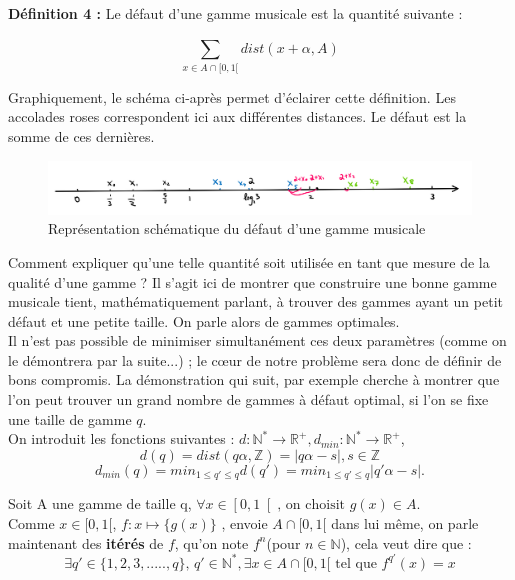 \documentclass[moyen]{classeUPD}
\newenvironment{definition}{
	\begin{lrbox}{\tempbox}
		\begin{minipage}{\textwidth}
		}{
		\end{minipage}
	\end{lrbox}
	\begin{center}
		\fcolorbox[HTML]{222222}{EEEEEE}{
			\usebox{\tempbox}
		}
	\end{center}
}
\newcommand{\emf}[1]{\textbf{#1}}
\begin{document}
\begin{definition}
\emf{Définition 4 :} Le défaut d'une gamme musicale est la quantité suivante :

\begin{equation*}
\sum_{x\in A \cap [0,1[}^{} dist(x+\alpha,A)
\end{equation*}

\end{definition}

Graphiquement, le schéma ci-après permet d'éclairer cette définition. Les accolades roses correspondent ici aux différentes distances. Le défaut est la somme de ces dernières.
 
\begin{figure}[h!]
	\begin{center}
		\includegraphics[width=0.7\textheight]{picture1}
		\caption{Représentation schématique du défaut d'une gamme musicale}
		\label{figure 4}
	\end{center}
\end{figure}

Comment expliquer qu’une telle quantité soit utilisée en tant que mesure de la qualité d’une gamme ? Il s’agit ici de montrer que construire une bonne gamme musicale tient, mathématiquement parlant, à trouver des gammes ayant un petit défaut et une petite taille. On parle alors de gammes optimales.\\
Il n’est pas possible de minimiser simultanément ces deux paramètres (comme on le démontrera par la suite...) ; le cœur de notre problème sera donc de définir de bons compromis. La démonstration qui suit, par exemple cherche à montrer que l’on peut trouver un grand nombre de gammes à défaut optimal, si l’on se fixe une taille de gamme $q$.\\

On introduit les fonctions suivantes : $d: \mathbb{N^{*}} \longrightarrow \mathbb{R^{+}} ,d_{min} :\mathbb{N^{*}} \longrightarrow \mathbb{R^{+}} $,
$$d(q)=dist(q\alpha, \mathbb{Z})= \left|q\alpha  - s\right| ,s \in \mathbb{Z}$$
$$d_{min}(q) = min _{1 \le q' \le q} d(q') = min_{1 \le q' \le q} \left|q'\alpha - s\right| .$$

Soit A une gamme de taille q, 
$ \forall x \in \left[0,1\right[ 
\text{, on choisit } g(x)\in A$. \\
Comme $x \in [0,1[ $,  $f: x \mapsto  \{g(x)\}$  , envoie $A\cap [0,1[$ dans lui même, on parle maintenant des \textbf{itérés} de $f$, qu'on note $f^{n}$(pour $n \in \mathbb{N}$), cela veut dire que :
$$\exists q'\in \{1,2,3,.....,q\} \text{, } q'\in \mathbb{N^{*}},\exists x \in A \cap [0,1[ \text{ tel que } f^{q'}(x) = x$$
\end{document}
